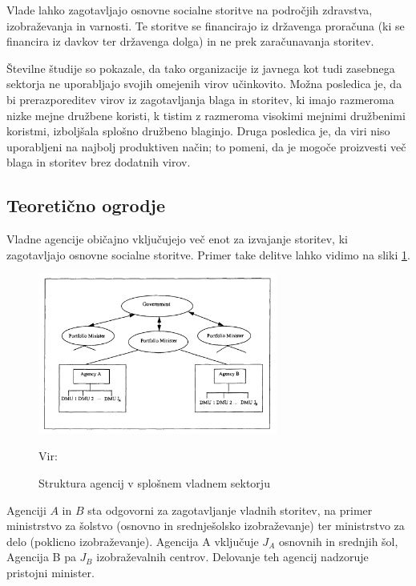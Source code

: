 \documentclass[12pt,a4paper]{article}
\theoremstyle{definition}
\begin{document}
Vlade lahko zagotavljajo osnovne socialne storitve na področjih
zdravstva, izobraževanja in varnosti. Te storitve se financirajo
iz državenga proračuna (ki se financira iz davkov ter državenga
dolga) in ne prek zaračunavanja storitev. 

Številne študije so pokazale, da tako organizacije iz javnega
kot tudi zasebnega sektorja ne uporabljajo svojih omejenih virov
učinkovito. Možna posledica je, da bi prerazporeditev virov iz
zagotavljanja blaga in storitev, ki imajo razmeroma nizke
mejne družbene koristi, k tistim z razmeroma visokimi mejnimi
družbenimi koristmi, izboljšala splošno družbeno blaginjo.
Druga posledica je, da viri niso uporabljeni na najbolj 
produktiven način; to pomeni, da je mogoče proizvesti več
blaga in storitev brez dodatnih virov. \cite{Yaisawarng2002}

\subsection{Teoretično ogrodje}

Vladne agencije običajno vključujejo več enot za izvajanje 
storitev, ki zagotavljajo osnovne socialne storitve. 
Primer take delitve lahko vidimo na sliki 
\ref{fig:government_structure}.


\begin{figure}[htbp]
    \centering
    \includegraphics[width=0.7\textwidth]{government_structure.png}
    \caption{Struktura agencij v splošnem vladnem sektorju}
    \label{fig:government_structure}
    \vspace{0.2em}
    \footnotesize{Vir: \cite{Lovell2002}}
\end{figure}

Agenciji $A$ in $B$ sta odgovorni za zagotavljanje vladnih storitev, 
na primer ministrstvo za šolstvo (osnovno in srednješolsko 
izobraževanje) ter ministrstvo za delo (poklicno izobraževanje).
Agencija A vključuje $J_A$ osnovnih in srednjih šol, Agencija B 
pa $J_B$ izobraževalnih centrov. Delovanje teh agencij nadzoruje
pristojni minister. \cite{Yaisawarng2002}
\end{document}
